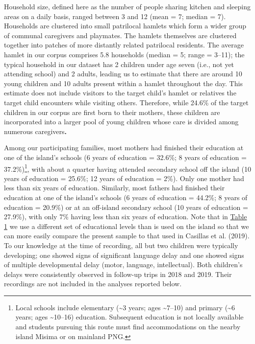 \documentclass[,man,floatsintext]{apa6}
\let\rmarkdownfootnote\footnote%
\def\footnote{\protect\rmarkdownfootnote}
\begin{document}
Household size, defined here as the number of people sharing kitchen and
sleeping areas on a daily basis, ranged between 3 and 12 (mean = 7;
median = 7). Households are clustered into small patrilocal hamlets
which form a wider group of communal caregivers and playmates. The
hamlets themselves are clustered together into patches of more distantly
related patrilocal residents. The average hamlet in our corpus comprises
5.8 households (median = 5; range = 3--11); the typical household in our
dataset has 2 children under age seven (i.e., not yet attending school)
and 2 adults, leading us to estimate that there are around 10 young
children and 10 adults present within a hamlet throughout the day. This
estimate does not include visitors to the target child's hamlet or
relatives the target child encounters while visiting others. Therefore,
while 24.6\% of the target children in our corpus are first born to
their mothers, these children are incorporated into a larger pool of
young children whose care is divided among numerous caregivers\textbf{.}

Among our participating families, most mothers had finished their
education at one of the island's schools (6 years of education = 32.6\%;
8 years of education = 37.2\%)\footnote{Local schools include elementary
  (\textasciitilde{}3 years; ages \textasciitilde{}7--10) and primary
  (\textasciitilde{}6 years; ages \textasciitilde{}10--16) education.
  Subsequent education is not locally available and students pursuing
  this route must find accommodations on the nearby island Misima or on
  mainland PNG.}, with about a quarter having attended secondary school
off the island (10 years of education = 25.6\%; 12 years of education =
2\%). Only one mother had less than six years of education. Similarly,
most fathers had finished their education at one of the island's schools
(6 years of education = 44.2\%; 8 years of education = 20.9\%) or at an
off-island secondary school (10 years of education = 27.9\%), with only
7\% having less than six years of education. Note that in
\protect\hyperlink{tab1}{Table 1} we use a different set of educational
levels than is used on the island so that we can more easily compare the
present sample to that used in Casillas et al. (2019). To our knowledge
at the time of recording, all but two children were typically
developing; one showed signs of significant language delay and one
showed signs of multiple developmental delay (motor, language,
intellectual). Both children's delays were consistently observed in
follow-up trips in 2018 and 2019. Their recordings are not included in
the analyses reported below.
\end{document}
